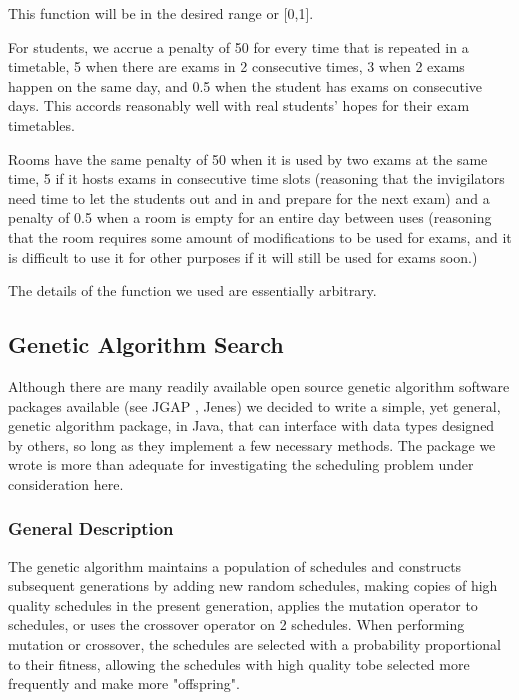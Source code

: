 \documentclass[letterpaper]{article}
\begin{document}
    This function will be in the desired range or [0,1].
    
    For students, we accrue a penalty of 50 for every time that is repeated in a 
    timetable, 5 when there are exams in 2 consecutive times, 3 when 2 exams happen 
    on the same day, and 0.5 when the student has exams on consecutive days. This 
    accords reasonably well with real students' hopes for their exam timetables.
    
    Rooms have the same penalty of 50 when it is used by two exams at the same time, 
    5 if it hosts exams in consecutive time slots (reasoning that the invigilators 
    need time to let the students out and in and prepare for the next exam) and a 
    penalty of 0.5 when a room is empty for an entire day between uses (reasoning 
    that the room requires some amount of modifications to be used for exams, and 
    it is difficult to use it for other purposes if it will still be used for exams 
    soon.)
    
    The details of the function we used are essentially arbitrary.
    
  \subsection{Genetic Algorithm Search}
    Although there are many readily available open source genetic algorithm software
    packages available (see JGAP \cite{website:JGAP}, Jenes\cite{website:jenes}) we 
    decided to write a simple, yet general, genetic algorithm package, in Java, that
    can interface with data types designed by others, so long as they implement a few
    necessary methods. The package we wrote is more than adequate for investigating
    the scheduling problem under consideration here.
    
    \subsubsection{General Description}
      The genetic algorithm maintains a population of schedules and constructs subsequent
      generations by adding new random schedules, making copies of high quality schedules 
      in the present generation, applies the mutation operator to schedules, or uses the
      crossover operator on 2 schedules. When performing mutation or crossover, the 
      schedules are selected with a probability proportional to their fitness, allowing 
      the schedules with high quality tobe selected more frequently and make more 
      "offspring". 
      
\end{document}
